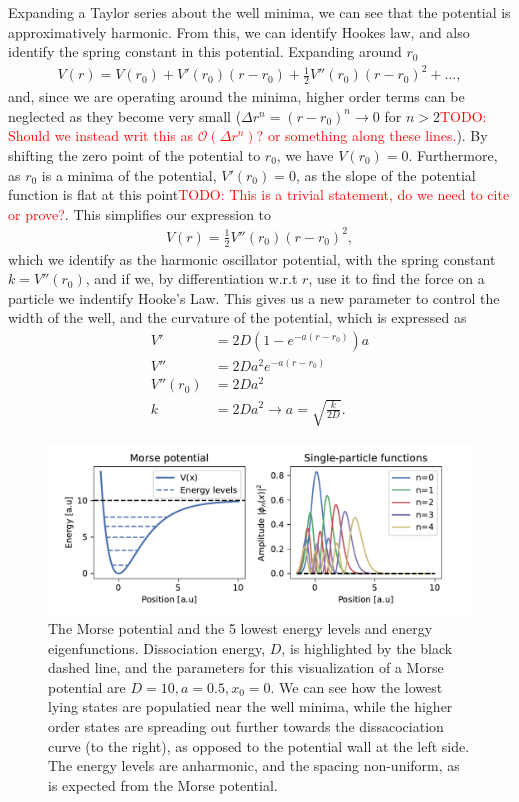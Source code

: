\documentclass{subfiles}
\begin{document}
Expanding a Taylor series about the well minima, we can see that the potential is approximatively harmonic. From this, we can identify Hookes law, and also identify the spring constant in this potential. Expanding around $r_0$
\begin{align*}
    V(r) = V(r_0) + V'(r_0)(r-r_0) + \frac{1}{2}V''(r_0)(r-r_0)^2 + ...,
\end{align*}
and, since we are operating around the minima, higher order terms can be neglected as they become very small ($\Delta r^n = (r - r_0)^n\to 0$ for $n>2$\textcolor{red}{TODO: Should we instead writ this as $\mathcal{O}(\Delta r^n)$? or something along these lines.}). By shifting the zero point of the potential to $r_0$, we have $V(r_0) = 0$. Furthermore, as $r_0$ is a minima of the potential, $V'(r_0) = 0$, as the slope of the potential function is flat at this point\textcolor{red}{TODO: This is a trivial statement, do we need to cite or prove?}. This simplifies our expression to
\begin{align*}
    V(r) = \frac{1}{2}V''(r_0)(r-r_0)^2,
\end{align*}
which we identify as the harmonic oscillator potential, with the spring constant $k = V''(r_0)$, and if we, by differentiation w.r.t $r$, use it to find the force on a particle we indentify Hooke's Law. This gives us a new parameter to control the width of the well, and the curvature of the potential, which is expressed as
\begin{align*}
    V' &= 2D(1 - e^{-a(r-r_0)})a \\
    V'' &= 2Da^2e^{-a(r-r_0)} \\
    V''(r_0) &= 2Da^2 \\
    k &= 2Da^2 \rightarrow a = \sqrt{\frac{k}{2D}}.
\end{align*} 
\begin{figure}[h!]
    \centering
    \includegraphics[width=1.0\textwidth]{figs/potential_spf.pdf}
    \caption{The Morse potential and the 5 lowest energy levels and energy eigenfunctions. Dissociation energy, $D$, is highlighted by the black dashed line, and the parameters for this visualization of a Morse potential are $D=10, a=0.5, x_0=0$. We can see how the lowest lying states are populatied near the well minima, while the higher order states are spreading out further towards the dissacociation curve (to the right), as opposed to the potential wall at the left side. The energy levels are anharmonic, and the spacing non-uniform, as is expected from the Morse potential. }
    \label{fig:morse_potential}
\end{figure}
\end{document}
